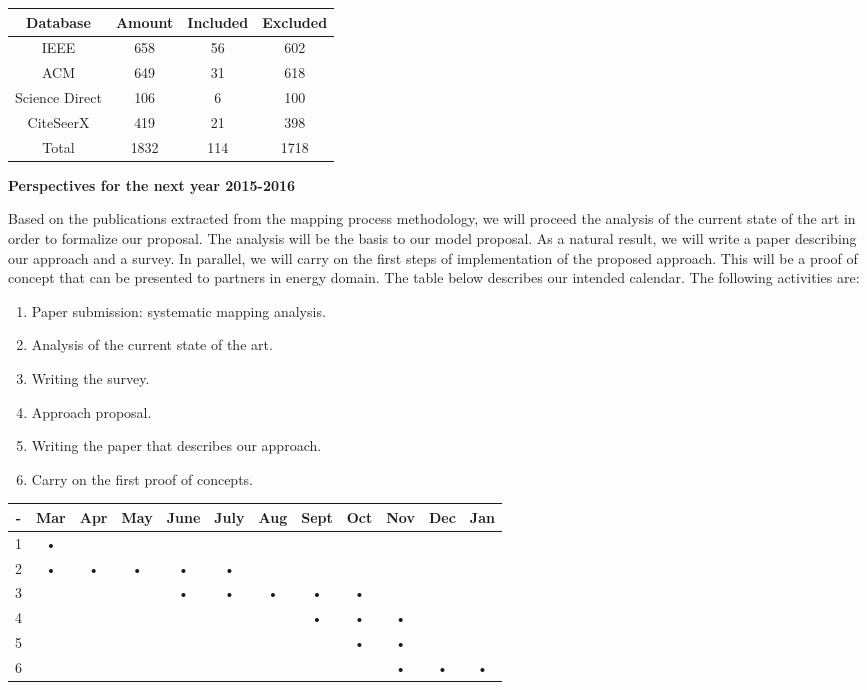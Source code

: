 \documentclass[12pt,a4paper,oneside]{report}
\begin{document}
\begin{center}
\begin{tabular}{|c|c|c|c|}
\hline 
Database & Amount & Included & Excluded \\ 
\hline 
IEEE & 658 & 56 & 602 \\ 
\hline 
ACM & 649 & 31 & 618 \\ 
\hline 
Science Direct & 106 & 6 & 100 \\ 
\hline 
CiteSeerX & 419 & 21 & 398 \\ 
\hline 
Total & 1832 & 114 & 1718 \\ 
\hline 
\end{tabular}\label{fig1} 
\end{center}



\begin{flushleft}
\textbf{Perspectives for the next year 2015-2016}\\
\end{flushleft}
Based on the publications extracted from the mapping process methodology, we will proceed the analysis of the current state of the art in order to formalize our proposal. The analysis will be the basis to our model proposal. As a natural result, we will write a paper describing our approach and a survey. In parallel, we will carry on the first steps of implementation of the proposed approach.
This will be a proof of concept that can be presented to partners in energy domain.
The table below describes our intended calendar. The following activities are:
\begin{enumerate}
\item Paper submission: systematic mapping analysis.
\item Analysis of the current state of the art.
\item Writing the survey. 
\item Approach proposal.
\item Writing the paper that describes our approach.
\item Carry on the first proof of concepts.
\end{enumerate}

\begin{center}
\begin{tabular}{|c|c|c|c|c|c|c|c|c|c|c|c|}
\hline 
- & Mar & Apr & May & June & July & Aug & Sept & Oct & Nov & Dec & Jan \\ 
\hline 
1 & • &  &  &  &  &  &  &  &  &  &  \\ 
\hline 
2 & • & • & • & • & • &  &  &  &  &  &  \\ 
\hline 
3 &  &  &  & • & • & • & • & • &  &  &  \\ 
\hline 
4 &  &  &  &  &  &  & • & • & • &  &  \\ 
\hline 
5 &  &  &  &  &  &  &  & • & • &  &  \\ 
\hline 
6 &  &  &  &  &  &  &  &  & • & • & • \\ 
\hline 
\end{tabular} 
\end{center}
\end{document}
